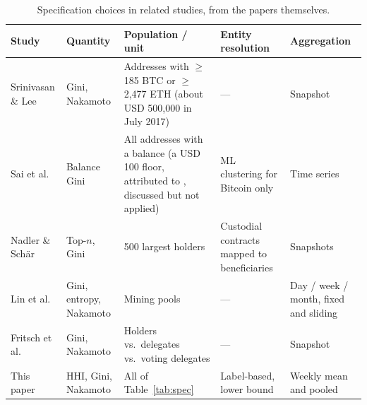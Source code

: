\begin{table}[t]
\centering\footnotesize
\caption{Specification choices in related studies, from the papers
themselves.}
\label{tab:lit}
\setlength{\tabcolsep}{4pt}
\begin{tabular}{@{}>{\raggedright}p{2.7cm}>{\raggedright}p{2.3cm}>{\raggedright}p{4.4cm}>{\raggedright}p{3.6cm}>{\raggedright\arraybackslash}p{3.0cm}@{}}
\toprule
Study & Quantity & Population / unit & Entity resolution & Aggregation \\
\midrule
Srinivasan \& Lee \cite{srinivasan2017quantifying} & Gini, Nakamoto & Addresses with $\geq$185 BTC or $\geq$2,477 ETH (about USD 500,000 in July 2017) & --- & Snapshot \\
Sai et al.\ \cite{sai2021wealth} & Balance Gini & All addresses with a balance (a USD 100 floor, attributed to \cite{srinivasan2017quantifying}, discussed but not applied) & ML clustering for Bitcoin only & Time series \\
Nadler \& Sch\"ar \cite{nadler2022defi} & Top-$n$, Gini & 500 largest holders & Custodial contracts mapped to beneficiaries & Snapshots \\
Lin et al.\ \cite{lin2021measuring} & Gini, entropy, Nakamoto & Mining pools & --- & Day / week / month, fixed and sliding \\
Fritsch et al.\ \cite{fritsch2024voting} & Gini, Nakamoto & Holders vs.\ delegates vs.\ voting delegates & --- & Snapshot \\
This paper & HHI, Gini, Nakamoto & All of Table~\ref{tab:spec} & Label-based, lower bound & Weekly mean and pooled \\
\bottomrule
\end{tabular}
\end{table}

